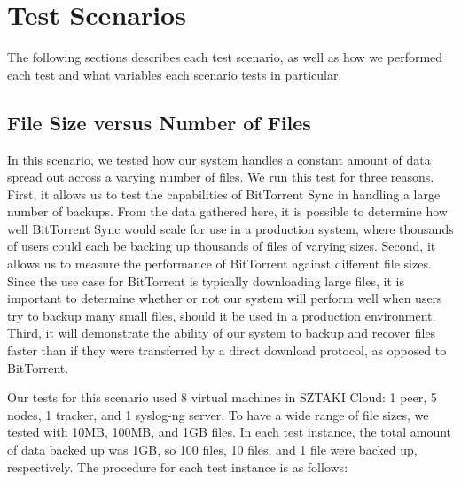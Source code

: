 \documentclass[12pt]{report}
\begin{document}
\section{Test Scenarios} \label{sec:TestScenatios_chap:Methodology}

The following sections describes each test scenario, as well as how we performed each test and what variables each scenario tests in particular.

\subsection{File Size versus Number of Files} \label{subsec:FileSizeversusNumberofFiles_sec:TestScenarios_chap:Methodology}

In this scenario, we tested how our system handles a constant amount of data spread out across a varying number of files. We run this test for three reasons. First, it allows us to test the capabilities of BitTorrent Sync in handling a large number of backups. From the data gathered here, it is possible to determine how well BitTorrent Sync would scale for use in a production system, where thousands of users could each be backing up thousands of files of varying sizes. Second, it allows us to measure the performance of BitTorrent against different file sizes. Since the use case for BitTorrent is typically downloading large files, it is important to determine whether or not our system will perform well when users try to backup many small files, should it be used in a production environment. Third, it will demonstrate the ability of our system to backup and recover files faster than if they were transferred by a direct download protocol, as opposed to BitTorrent.

Our tests for this scenario used 8 virtual machines in SZTAKI Cloud: 1 peer, 5 nodes, 1 tracker, and 1 syslog-ng server. To have a wide range of file sizes, we tested with 10MB, 100MB, and 1GB files. In each test instance, the total amount of data backed up was 1GB, so 100 files, 10 files, and 1 file were backed up, respectively. The procedure for each test instance is as follows:
\end{document}
